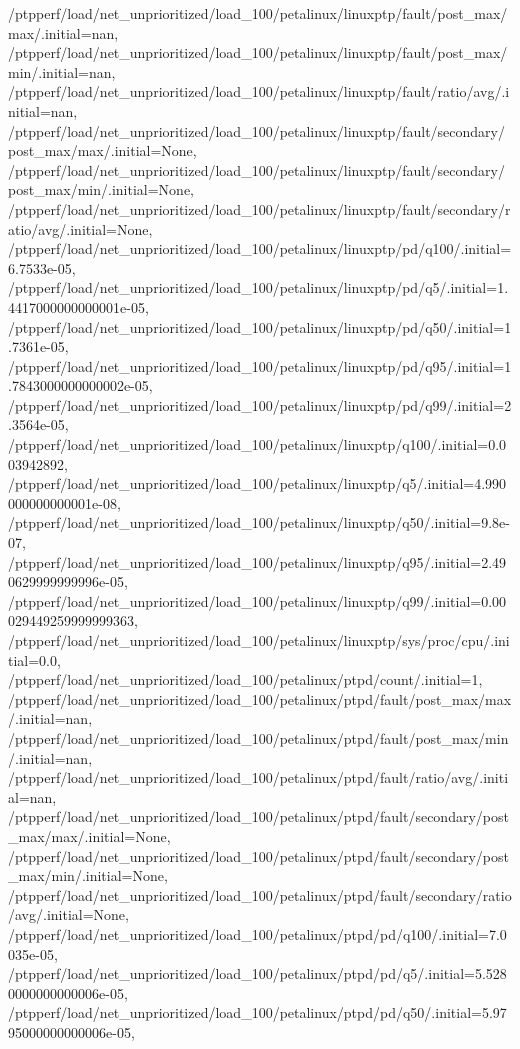 {    /ptpperf/load/net_unprioritized/load_100/petalinux/linuxptp/fault/post_max/max/.initial=nan,
    /ptpperf/load/net_unprioritized/load_100/petalinux/linuxptp/fault/post_max/min/.initial=nan,
    /ptpperf/load/net_unprioritized/load_100/petalinux/linuxptp/fault/ratio/avg/.initial=nan,
    /ptpperf/load/net_unprioritized/load_100/petalinux/linuxptp/fault/secondary/post_max/max/.initial=None,
    /ptpperf/load/net_unprioritized/load_100/petalinux/linuxptp/fault/secondary/post_max/min/.initial=None,
    /ptpperf/load/net_unprioritized/load_100/petalinux/linuxptp/fault/secondary/ratio/avg/.initial=None,
    /ptpperf/load/net_unprioritized/load_100/petalinux/linuxptp/pd/q100/.initial=6.7533e-05,
    /ptpperf/load/net_unprioritized/load_100/petalinux/linuxptp/pd/q5/.initial=1.4417000000000001e-05,
    /ptpperf/load/net_unprioritized/load_100/petalinux/linuxptp/pd/q50/.initial=1.7361e-05,
    /ptpperf/load/net_unprioritized/load_100/petalinux/linuxptp/pd/q95/.initial=1.7843000000000002e-05,
    /ptpperf/load/net_unprioritized/load_100/petalinux/linuxptp/pd/q99/.initial=2.3564e-05,
    /ptpperf/load/net_unprioritized/load_100/petalinux/linuxptp/q100/.initial=0.003942892,
    /ptpperf/load/net_unprioritized/load_100/petalinux/linuxptp/q5/.initial=4.990000000000001e-08,
    /ptpperf/load/net_unprioritized/load_100/petalinux/linuxptp/q50/.initial=9.8e-07,
    /ptpperf/load/net_unprioritized/load_100/petalinux/linuxptp/q95/.initial=2.490629999999996e-05,
    /ptpperf/load/net_unprioritized/load_100/petalinux/linuxptp/q99/.initial=0.00029449259999999363,
    /ptpperf/load/net_unprioritized/load_100/petalinux/linuxptp/sys/proc/cpu/.initial=0.0,
    /ptpperf/load/net_unprioritized/load_100/petalinux/ptpd/count/.initial=1,
    /ptpperf/load/net_unprioritized/load_100/petalinux/ptpd/fault/post_max/max/.initial=nan,
    /ptpperf/load/net_unprioritized/load_100/petalinux/ptpd/fault/post_max/min/.initial=nan,
    /ptpperf/load/net_unprioritized/load_100/petalinux/ptpd/fault/ratio/avg/.initial=nan,
    /ptpperf/load/net_unprioritized/load_100/petalinux/ptpd/fault/secondary/post_max/max/.initial=None,
    /ptpperf/load/net_unprioritized/load_100/petalinux/ptpd/fault/secondary/post_max/min/.initial=None,
    /ptpperf/load/net_unprioritized/load_100/petalinux/ptpd/fault/secondary/ratio/avg/.initial=None,
    /ptpperf/load/net_unprioritized/load_100/petalinux/ptpd/pd/q100/.initial=7.0035e-05,
    /ptpperf/load/net_unprioritized/load_100/petalinux/ptpd/pd/q5/.initial=5.5280000000000006e-05,
    /ptpperf/load/net_unprioritized/load_100/petalinux/ptpd/pd/q50/.initial=5.9795000000000006e-05,
}
